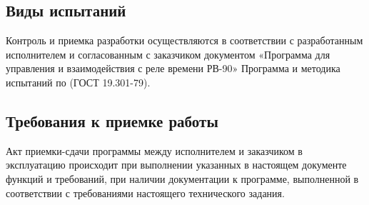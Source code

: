 \subsection{Виды испытаний}
Контроль и приемка разработки осуществляются в соответствии с разработанным исполнителем и согласованным с заказчиком документом «Программа для управления и взаимодействия с реле времени РВ-90» Программа и методика испытаний по (ГОСТ 19.301-79).

\subsection{Требования к приемке работы}
Акт приемки-сдачи программы между исполнителем и заказчиком в эксплуатацию происходит при выполнении указанных в настоящем документе функций и требований, при наличии документации к программе, выполненной в соответствии с требованиями настоящего технического задания.